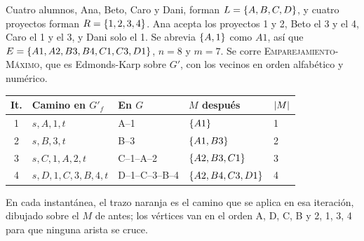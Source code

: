 \documentclass[11pt,letterpaper]{article}
\begin{document}
\begin{ejemplo}
  \label{ej:emparejamiento-alumnos}
  Cuatro alumnos, Ana, Beto, Caro y Dani, forman
  $L = \left\{ A, B, C, D \right\}$, y cuatro proyectos forman
  $R = \left\{ 1, 2, 3, 4 \right\}$. Ana acepta los proyectos 1 y 2, Beto el 3 y
  el 4, Caro el 1 y el 3, y Dani solo el 1. Se abrevia $\left\{ A, 1 \right\}$
  como $A1$, así que $E = \left\{ A1, A2, B3, B4, C1, C3, D1 \right\}$, $n = 8$ y
  $m = 7$. Se corre \textsc{Emparejamiento-Máximo}, que es
  Edmonds-Karp sobre $G'$, con los vecinos en orden alfabético y
  numérico.
  \begin{center}
  \small
  \begin{tabular}{cllll}
    \toprule
    \textbf{It.} & \textbf{Camino en $G'_f$} & \textbf{En $G$}
      & \textbf{$M$ después} & $\left\lvert M \right\rvert$ \\
    \midrule
    1 & $s, A, 1, t$ & A--1 & $\left\{ A1 \right\}$ & 1 \\
    2 & $s, B, 3, t$ & B--3 & $\left\{ A1, B3 \right\}$ & 2 \\
    3 & $s, C, 1, A, 2, t$ & C--1--A--2 & $\left\{ A2, B3, C1 \right\}$ & 3 \\
    4 & $s, D, 1, C, 3, B, 4, t$ & D--1--C--3--B--4
      & $\left\{ A2, B4, C3, D1 \right\}$ & 4 \\
    \bottomrule
  \end{tabular}
  \end{center}
  En cada instantánea, el trazo naranja es el camino que se aplica en
  esa iteración, dibujado sobre el $M$ de antes; los vértices van en
  el orden A, D, C, B y 2, 1, 3, 4 para que ninguna arista se cruce.
  \begin{center}
\end{center}
\end{ejemplo}
\end{document}
